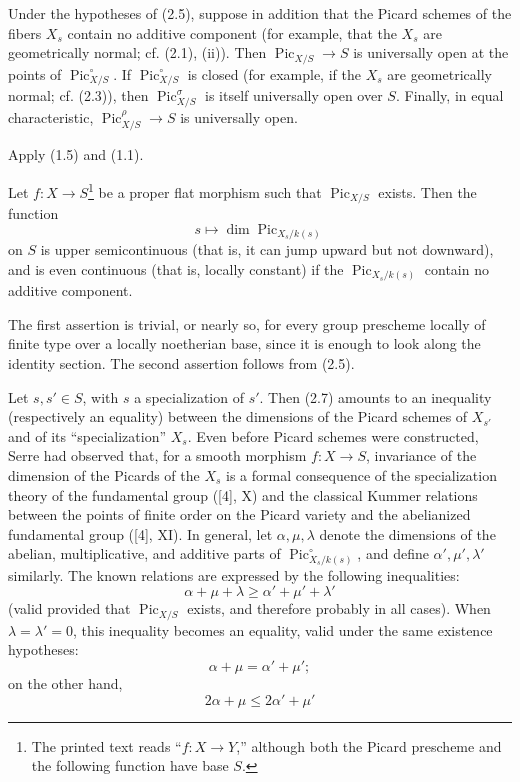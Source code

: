  Under the hypotheses of (2.5), suppose in addition that
the Picard schemes of the fibers $X_s$ contain no additive component (for
example, that the $X_s$ are geometrically normal; cf. (2.1), (ii)). Then
$\operatorname{Pic}_{X/S}\longrightarrow S$ is universally open at the points
of $\operatorname{Pic}_{X/S}^\circ$. If
$\operatorname{Pic}_{X/S}^\circ$ is closed (for example, if the $X_s$ are
geometrically normal; cf. (2.3)), then $\operatorname{Pic}_{X/S}^\sigma$ is
itself universally open over $S$. Finally, in equal characteristic,
$\operatorname{Pic}_{X/S}^\rho\longrightarrow S$ is universally open.

Apply (1.5) and (1.1).

 Let $f:X\longrightarrow S$\footnote{The printed text
reads “$f:X\longrightarrow Y$,” although both the Picard prescheme and the
following function have base $S$.} be a proper flat morphism such that
$\operatorname{Pic}_{X/S}$ exists. Then the function
\[
s\longmapsto\dim\operatorname{Pic}_{X_s/k(s)}
\]
on $S$ is upper semicontinuous (that is, it can jump upward but not downward),
and is even continuous (that is, locally constant) if the
$\operatorname{Pic}_{X_s/k(s)}$ contain no additive component.

The first assertion is trivial, or nearly so, for every group prescheme
locally of finite type over a locally noetherian base, since it is enough to
look along the identity section. The second assertion follows from (2.5).

 Let $s,s'\in S$, with $s$ a specialization of $s'$. Then
(2.7) amounts to an inequality (respectively an equality) between the
dimensions of the Picard schemes of $X_{s'}$ and of its “specialization” $X_s$.
Even before Picard schemes were constructed, Serre had observed that, for a
smooth morphism $f:X\longrightarrow S$, invariance of the dimension of the
Picards of the $X_s$ is a formal consequence of the specialization theory of
the fundamental group ([4], X) and the classical Kummer relations between the
points of finite order on the Picard variety and the abelianized fundamental
group ([4], XI). In general, let $\alpha,\mu,\lambda$ denote the dimensions of
the abelian, multiplicative, and additive parts of
$\operatorname{Pic}_{X_s/k(s)}^\circ$, and define
$\alpha',\mu',\lambda'$ similarly. The known relations are expressed by the
following inequalities:
\[
\tag{*}\alpha+\mu+\lambda\geq\alpha'+\mu'+\lambda'
\]
(valid provided that $\operatorname{Pic}_{X/S}$ exists, and therefore probably
in all cases). When $\lambda=\lambda'=0$, this inequality becomes an equality,
valid under the same existence hypotheses:
\[
\alpha+\mu=\alpha'+\mu';
\]
on the other hand,
\[
\tag{**}2\alpha+\mu\leq2\alpha'+\mu'
\]

